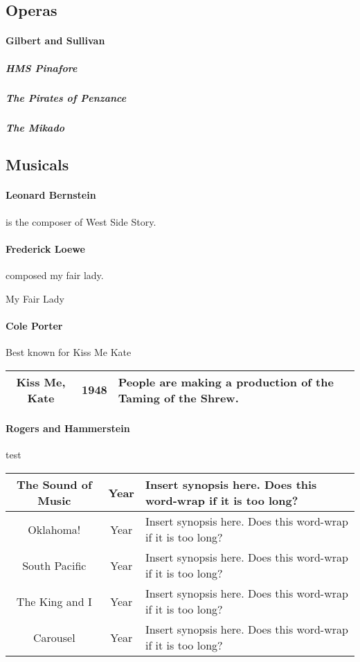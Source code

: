 			
		\subsection{Operas}
		
		
		
		\paragraph{Gilbert and Sullivan}
			\subparagraph{HMS Pinafore}
			\subparagraph{The Pirates of Penzance}
			\subparagraph{The Mikado}
\newpage
		\subsection{Musicals}
		\paragraph{Leonard Bernstein} is the composer of West Side Story.  
		



		\paragraph {Frederick Loewe} composed my fair lady.
		
		My Fair Lady

		\paragraph{Cole Porter}
		Best known for Kiss Me Kate
			\begin{longtable}{|c|c|p{3in}|}
	
	
				\hline
				Kiss Me, Kate & 1948 & People are making a production of the Taming of the Shrew.  \\
				\hline
	
	
	
	
\end{longtable}
		\paragraph{Rogers and Hammerstein} test

			\begin{longtable}{|c|c|p{3in}|}
				\hline
				The Sound of Music & Year & Insert synopsis here.  Does this word-wrap if it is too long?  \\
				\hline
				Oklahoma! & Year & Insert synopsis here.  Does this word-wrap if it is too long?  \\
				\hline
				South Pacific & Year & Insert synopsis here.  Does this word-wrap if it is too long? \\
				\hline
				The King and I & Year & Insert synopsis here.  Does this word-wrap if it is too long?  \\
				\hline
				Carousel & Year & Insert synopsis here.  Does this word-wrap if it is too long? \\
				\hline
			\end{longtable}


